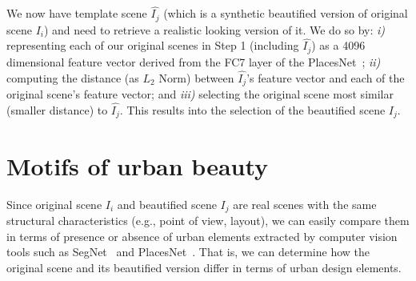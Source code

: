 We now have template scene $\hat{I_j}$ (which is a synthetic beautified version of original scene $I_i$) and need to retrieve a realistic looking version of it. We do so by: \emph{i)} representing each of our original scenes in Step 1 (including $\hat{I_j}$) as a 4096 dimensional feature vector derived from the FC7 layer of the PlacesNet~\cite{zhou2014learning}; \emph{ii)} computing the distance (as $L_2$ Norm) between $\hat{I_j}$'s feature vector and each of the original scene's feature vector; and \emph{iii)} selecting the original scene most similar (smaller distance) to $\hat{I_j}$. This results into the selection of the beautified scene $I_j$.


\section{Motifs of urban beauty}
Since original scene $I_i$ and beautified scene $I_j$ are real scenes with the  same structural characteristics (e.g., point of view, layout), we can easily compare them in terms of presence or absence of urban elements extracted by computer vision tools such as SegNet~\cite{badrinarayanan2015segnet} and PlacesNet~\cite{zhou2014learning}. That is, we can determine how the original scene and its beautified version differ in terms of urban design elements. 

